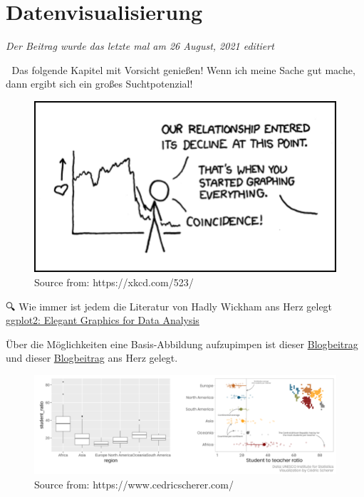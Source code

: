 \documentclass[
]{article}
\begin{document}
\hypertarget{datenvisualisierung}{%
\section{Datenvisualisierung}\label{datenvisualisierung}}

\emph{Der Beitrag wurde das letzte mal am 26 August, 2021 editiert}

🚨 Das folgende Kapitel mit Vorsicht genießen! Wenn ich meine Sache gut mache, dann ergibt sich ein großes Suchtpotenzial!

\begin{figure}

{\centering \includegraphics[width=1\linewidth]{images/050} 

}

\caption{Source from: https://xkcd.com/523/}\label{fig:unnamed-chunk-169}
\end{figure}

🔍 Wie immer ist jedem die Literatur von Hadly Wickham ans Herz gelegt \href{https://ggplot2-book.org/introduction.html}{ggplot2: Elegant Graphics for Data Analysis}

Über die Möglichkeiten eine Basis-Abbildung aufzupimpen ist dieser \href{https://www.cedricscherer.com/2019/05/17/the-evolution-of-a-ggplot-ep.-1/}{Blogbeitrag} und dieser \href{https://www.cedricscherer.com/2019/08/05/a-ggplot2-tutorial-for-beautiful-plotting-in-r/\#colors}{Blogbeitrag} ans Herz gelegt.

\begin{figure}

{\centering \includegraphics[width=1\linewidth]{images/053} 

}

\caption{Source from: https://www.cedricscherer.com/}\label{fig:unnamed-chunk-170}
\end{figure}
\end{document}
